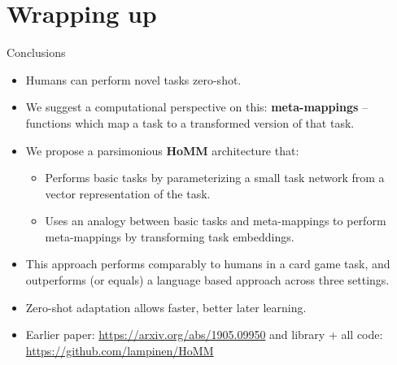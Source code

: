 \documentclass{beamer}
\begin{document}
\section{Wrapping up}

\begin{frame}{Conclusions}

\begin{itemize}
\item Humans can perform novel tasks zero-shot. 
\item We suggest a computational perspective on this: \textbf{meta-mappings} -- functions which map a task to a transformed version of that task. 
\item We propose a parsimonious \textbf{HoMM} architecture that: 
    \begin{itemize}
    \item Performs basic tasks by parameterizing a small task network from a vector representation of the task. 
    \item Uses an analogy between basic tasks and meta-mappings to perform meta-mappings by transforming task embeddings. 
    \end{itemize}
\item This approach performs comparably to humans in a card game task, and outperforms (or equals) a language based approach across three settings.
\item Zero-shot adaptation allows faster, better later learning. 
\item Earlier paper: \url{https://arxiv.org/abs/1905.09950} and library + all code: \url{https://github.com/lampinen/HoMM}
\end{itemize}
\end{frame}
\end{document}
